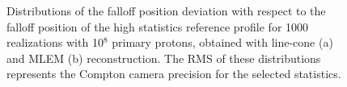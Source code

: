 \begin{figure}
  \centering
  \caption{Distributions of the falloff position deviation with respect to the falloff position of the high statistics reference profile for 1000 realizations with 10$^8$ primary protons, obtained with line-cone (a) and MLEM (b) reconstruction. The RMS of these distributions represents the Compton camera precision for the selected statistics.}\end{figure}

